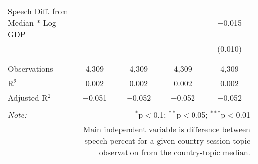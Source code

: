 \begin{table}[!htbp]
\begin{tabular}{@{\extracolsep{5pt}}lcccc}
 Speech Diff. from Median * Log GDP &  &  &  & $-$0.015 \\ 
  &  &  &  & (0.010) \\ 
  & & & & \\ 
\hline \\[-1.8ex] 
Observations & 4,309 & 4,309 & 4,309 & 4,309 \\ 
R$^{2}$ & 0.002 & 0.002 & 0.002 & 0.002 \\ 
Adjusted R$^{2}$ & $-$0.051 & $-$0.052 & $-$0.052 & $-$0.052 \\ 
\hline 
\hline \\[-1.8ex] 
\textit{Note:}  & \multicolumn{4}{r}{$^{*}$p$<$0.1; $^{**}$p$<$0.05; $^{***}$p$<$0.01} \\ 
 & \multicolumn{4}{r}{Main independent variable is difference between speech percent for a given country-session-topic observation from the country-topic median.} \\ 
\end{tabular} 
\end{table} 
